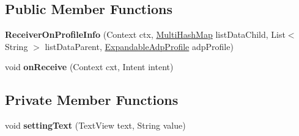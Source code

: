 \subsection*{Public Member Functions}
\begin{DoxyCompactItemize}
\item 
{\bfseries Receiver\+On\+Profile\+Info} (Context ctx, \hyperlink{classcom_1_1example_1_1sebastian_1_1tindertp_1_1commonTools_1_1MultiHashMap}{Multi\+Hash\+Map} list\+Data\+Child, List$<$ String $>$ list\+Data\+Parent, \hyperlink{classcom_1_1example_1_1sebastian_1_1tindertp_1_1ExpandedListAdapters_1_1ExpandableAdpProfile}{Expandable\+Adp\+Profile} adp\+Profile)\hypertarget{classcom_1_1example_1_1sebastian_1_1tindertp_1_1services_1_1ReceiverOnProfileInfo_aa676888bb81ca9b63aa72ac44be8a19a}{}\label{classcom_1_1example_1_1sebastian_1_1tindertp_1_1services_1_1ReceiverOnProfileInfo_aa676888bb81ca9b63aa72ac44be8a19a}

\item 
void {\bfseries on\+Receive} (Context cxt, Intent intent)\hypertarget{classcom_1_1example_1_1sebastian_1_1tindertp_1_1services_1_1ReceiverOnProfileInfo_a7c73d674602bc9119b9a84b238134107}{}\label{classcom_1_1example_1_1sebastian_1_1tindertp_1_1services_1_1ReceiverOnProfileInfo_a7c73d674602bc9119b9a84b238134107}

\end{DoxyCompactItemize}
\subsection*{Private Member Functions}
\begin{DoxyCompactItemize}
\item 
void {\bfseries setting\+Text} (Text\+View text, String value)\hypertarget{classcom_1_1example_1_1sebastian_1_1tindertp_1_1services_1_1ReceiverOnProfileInfo_ae54ede99c28efdfdc5cb83cb97a69845}{}\label{classcom_1_1example_1_1sebastian_1_1tindertp_1_1services_1_1ReceiverOnProfileInfo_ae54ede99c28efdfdc5cb83cb97a69845}

\end{DoxyCompactItemize}
